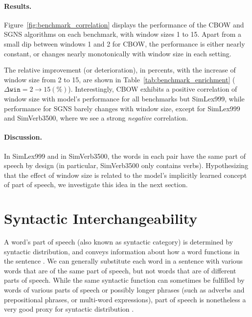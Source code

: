 \documentclass[11pt,a4paper]{article}
\begin{document}
    \paragraph{Results.}
    
    Figure~\ref{fig:benchmark_correlation} displays the performance of the CBOW and SGNS
    algorithms on each benchmark, with window sizes 1 to 15.
    Apart from a small dip between windows 1 and 2 for
    CBOW,
    the performance is either nearly constant,
    or changes nearly monotonically with window size in each setting.
    
    The relative improvement (or deterioration),
    in percents, with the increase of window size from 2 to 15,
    are shown in Table~\ref{tab:benchmark_enrichment} ($\Delta \mathtt{win}=2\to 15 (\%)$).
    Interestingly, CBOW exhibits a positive correlation of window size with model's performance
    for all benchmarks but SimLex999,
    while performance for SGNS barely changes with window size,
    except for SimLex999 and SimVerb3500, where we see a strong \textit{negative} correlation.
    
    \paragraph{Discussion.}
    
    In SimLex999 and in SimVerb3500, the words in each pair have the same part of speech by design
    (in particular, SimVerb3500 only contains verbs).
    Hypothesizing that the effect of window size is related to the model's
    implicitly learned concept of part of speech, we investigate this idea in the next section.
    
    
    \section{Syntactic Interchangeability}\label{sec:interchangeability}
    
    A word's part of speech (also known as syntactic category)
    is determined by syntactic distribution, and
    conveys information about how a word functions in the sentence \cite{carnie2002syntax}.
    We can generally substitute each word in a sentence
    with various words that are of the same part of speech,
    but not words that are of different parts of speech.
    While the same syntactic function can sometimes be fulfilled by words of
    various parts of speech or possibly longer phrases (such as adverbs and
    prepositional phrases, or multi-word expressions),
    part of speech is nonetheless a very good proxy for syntactic distribution
    \cite{W04-2404}.
    
\end{document}
